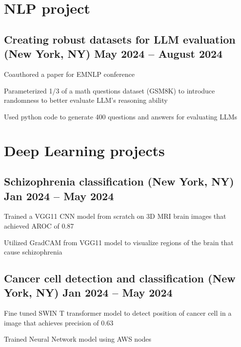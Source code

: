 \documentclass[a4paper,12pt]{article}
\begin{document}
\section{NLP project} 
\subsection{{Creating robust datasets for LLM evaluation \hfill\textnormal{(New York, NY)}  May 2024 -- August 2024}}
\begin{zitemize}
\item Coauthored a paper for EMNLP conference
\item Parameterized 1/3 of a math questions dataset (GSM8K) to introduce randomness to better evaluate LLM’s reasoning ability
    \item Used python code to generate 400 questions and answers for evaluating LLMs
\end{zitemize}

\section{Deep Learning projects}
\subsection{Schizophrenia classification	\hfill \textnormal{(New York, NY)} Jan 2024 -- May 2024}
\begin{zitemize}
\item Trained a VGG11 CNN model from scratch on 3D MRI brain images that achieved AROC of 0.87
\item Utilized GradCAM from VGG11 model to visualize regions of the brain that cause schizophrenia
\end{zitemize}
\subsection{Cancer cell detection and classification \hfill	\textnormal{(New York, NY)} Jan 2024 -- May 2024}
\begin{zitemize}
\item Fine tuned SWIN T transformer model to detect position of cancer cell in a image that achieves precision of 0.63
\item Trained Neural Network model using AWS nodes
\end{zitemize}
\end{document}
